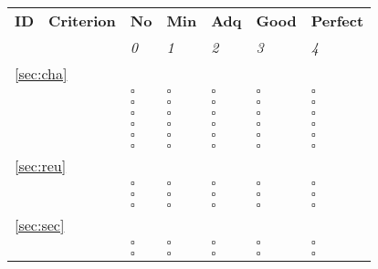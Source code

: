 \documentclass[a4paper,11pt]{article}
\begin{document}
\begin{table}[hbt]
	\begin{tabular}
		{ p{} | 
		  p{} |
		  p{} |
		  p{} |
		  p{} |
		  p{} |
		  p{} }
        \hline
		\textbf{ID} & \textbf{Criterion} & \textbf{No} & \textbf{Min} & \textbf{Adq} & \textbf{Good} & \textbf{Perfect} \\
                                        & & \emph{0} & \emph{1} & \emph{2} & \emph{3} & \emph{4} \\
        \hline 
		\multicolumn{7}{l}{\ref{sec:cha}{ }\nameref{sec:cha}} \\
		\hline	
		\hyperref[id:CH1]{\chOneID} & \chOneText & $\square$ & $\square$ & $\square$ & $\square$ & $\square$ \\
		\hyperref[id:CH2]{\chTwoID} & \chTwoText & $\square$ & $\square$ & $\square$ & $\square$ & $\square$ \\
		\hyperref[id:CH3]{\chThreeID} & \chThreeText & $\square$ & $\square$ & $\square$ & $\square$ & $\square$ \\
		\hyperref[id:CH4]{\chFourID} & \chFourText & $\square$ & $\square$ & $\square$ & $\square$ & $\square$ \\
		\hyperref[id:CH5]{\chFiveID} & \chFiveText & $\square$ & $\square$ & $\square$ & $\square$ & $\square$ \\
		\hyperref[id:CH6]{\chSixID} & \chSixText & $\square$ & $\square$ & $\square$ & $\square$ & $\square$ \\
		\hline
        \multicolumn{7}{l}{\ref{sec:reu}{ }\nameref{sec:reu}} \\
		\hline	
		\hyperref[id:R1]{\rOneID} & \rOneText & $\square$ & $\square$ & $\square$ & $\square$ & $\square$ \\
		\hyperref[id:R2]{\rTwoID} & \rTwoText & $\square$ & $\square$ & $\square$ & $\square$ & $\square$ \\
		\hyperref[id:R3]{\rThreeID} & \rThreeText & $\square$ & $\square$ & $\square$ & $\square$ & $\square$ \\
		\hline
		\multicolumn{7}{l}{\ref{sec:sec}{ }\nameref{sec:sec}} \\
		\hline	
		\hyperref[id:SC1]{\scOneID} & \scOneText & $\square$ & $\square$ & $\square$ & $\square$ & $\square$ \\
		\hyperref[id:SC2]{\scTwoID} & \scTwoText & $\square$ & $\square$ & $\square$ & $\square$ & $\square$ \\

\end{tabular}
\end{table}
\end{document}
